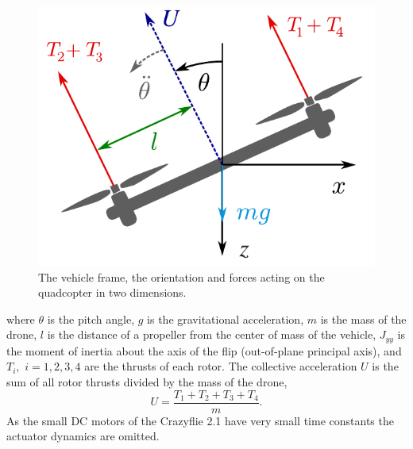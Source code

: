 \begin{figure}[b]
\centering
\includegraphics[width=.35\textwidth]{Fig/flip_frame_2.pdf}
\caption{The vehicle frame, the orientation and forces acting on the quadcopter in two dimensions.}\label{fig:flipframe}
\end{figure}

where $\theta$ is the pitch angle, $g$ is the gravitational acceleration, $m$ is the mass of the drone, $l$ is the distance of a propeller from the center of mass of the vehicle, $J_{yy}$ is the moment of inertia about the axis of the flip (out-of-plane principal axis), and $T_i,$ $i=1,2,3,4$ are the thrusts of each rotor. The collective acceleration $U$ is the sum of all rotor thrusts divided by the mass of the drone,
\begin{equation}
U = \frac{T_1 + T_2 + T_3 + T_4}{m}.\label{eq:opinp2}
\end{equation}
As the small DC motors of the Crazyflie 2.1 have very small time constants the actuator dynamics are omitted.%



